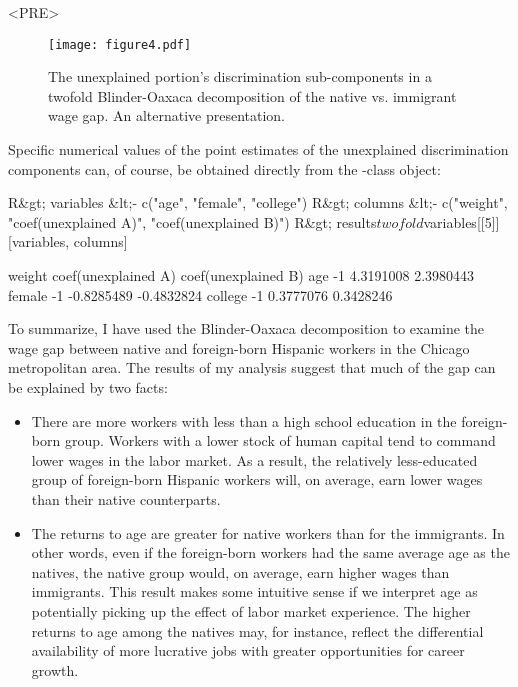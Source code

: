 <PRE>\documentclass[nojss]{jss}
\begin{document}
\begin{figure}[htp!]
	\centering
	\texttt{[image: figure4.pdf]}
	\caption{The unexplained portion's discrimination sub-components in a twofold Blinder-Oaxaca decomposition of the native vs. immigrant wage gap. An alternative presentation.}
	\label{FigTwofoldSplitLeft}
\end{figure}

\newpage
Specific numerical values of the point estimates of the unexplained discrimination components can, of course, be obtained directly from the -class object:

\begin{CodeInput}
R&gt; variables &lt;- c("age", "female", "college")
R&gt; columns &lt;- c("weight", "coef(unexplained A)", "coef(unexplained B)")
R&gt; results$twofold$variables[[5]][variables, columns]
\end{CodeInput}

\begin{CodeOutput}
        weight coef(unexplained A) coef(unexplained B)
age         -1           4.3191008           2.3980443
female      -1          -0.8285489          -0.4832824
college     -1           0.3777076           0.3428246
\end{CodeOutput}

To summarize, I have used the Blinder-Oaxaca decomposition to examine the wage gap between native and foreign-born Hispanic workers in the Chicago metropolitan area. The results of my analysis suggest that much of the gap can be explained by two facts:
\begin{itemize}
\item There are more workers with less than a high school education in the foreign-born group. Workers with a lower stock of human capital tend to command lower wages in the labor market. As a result, the relatively less-educated group of foreign-born Hispanic workers will, on average, earn lower wages than their native counterparts.
\item The returns to age are greater for native workers than for the immigrants. In other words, even if the foreign-born workers had the same average age as the natives, the native group would, on average, earn higher wages than immigrants. This result makes some intuitive sense if we interpret age as potentially picking up the effect of labor market experience. The higher returns to age among the natives may, for instance, reflect the differential availability of more lucrative jobs with greater opportunities for career growth.
\end{itemize}
\end{document}
